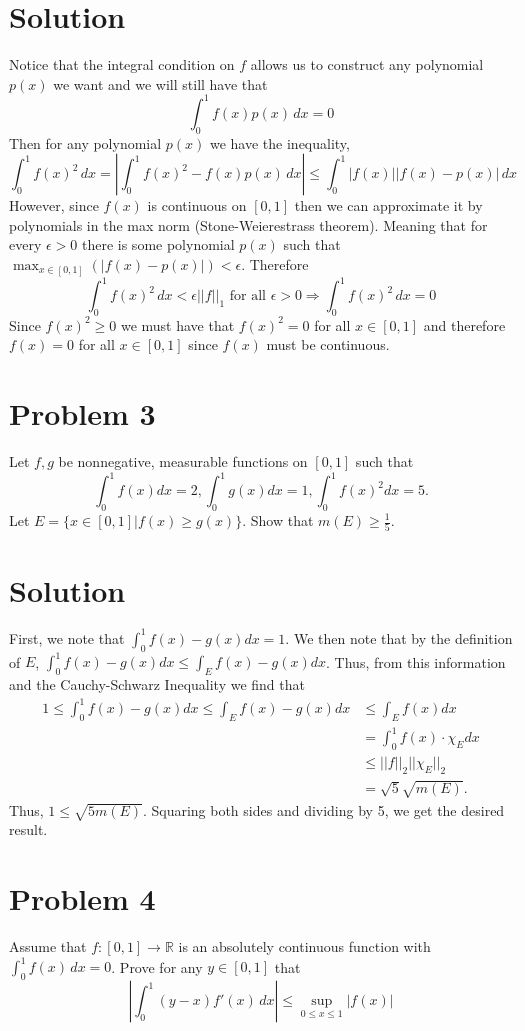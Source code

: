 \documentclass{article}
\newcommand{\field}[1]{\mathbb{#1}}
\begin{document}
\section*{Solution} 
Notice that the integral condition on $f$ allows us to construct any polynomial $p(x)$ we want and we will still have that
$$\int_0^1 f(x)p(x)\,dx=0$$
Then for any polynomial $p(x)$ we have the inequality,
$$\int_0^1f(x)^2\,dx=\left|\int_0^1f(x)^2-f(x)p(x)\,dx\right|\leq\int_0^1|f(x)||f(x)-p(x)|\,dx$$
However, since $f(x)$ is continuous on $[0,1]$ then we can approximate it by polynomials in the max norm (Stone-Weierestrass theorem). Meaning that for every $\epsilon>0$ there is some polynomial $p(x)$ such that $\max_{x\in[0,1]}(|f(x)-p(x)|)<\epsilon$. Therefore
$$\int_0^1f(x)^2\,dx<\epsilon||f||_1\text{ for all }\epsilon>0\Rightarrow\int_0^1f(x)^2\,dx=0$$
Since $f(x)^2\geq0$ we must have that $f(x)^2=0$ for all $x\in[0,1]$ and therefore $f(x)=0$ for all $x\in[0,1]$ since $f(x)$ must be continuous.

\section*{Problem 3}
Let $f,g$ be nonnegative, measurable functions on $[0,1]$ such that $$\int_0^1f(x)dx=2,\int_0^1g(x)dx=1,\int_0^1f(x)^2dx=5.$$  Let $E=\{x\in[0,1]|f(x)\geq g(x)\}.$ Show that $m(E)\geq\frac{1}{5}$.

\section*{Solution}
First, we note that $\int_0^1f(x)-g(x)dx=1$.  We then note that by the definition of $E$, $\int_0^1f(x)-g(x)dx\leq\int_Ef(x)-g(x)dx$.  Thus, from this information and the Cauchy-Schwarz Inequality we find that
\begin{align*}
1\leq\int_0^1f(x)-g(x)dx\leq\int_Ef(x)-g(x)dx&\leq\int_Ef(x)dx\\
&=\int_0^1f(x)\cdot\chi_Edx\\
&\leq||f||_2||\chi_E||_2\\
&=\sqrt{5}\sqrt{m(E)}.
\end{align*}
Thus, $1\leq\sqrt{5m(E)}$.  Squaring both sides and dividing by 5, we get the desired result.
\section*{Problem 4}
Assume that $f:[0,1]\to\field{R}$ is an absolutely continuous function with $\int_0^1 f(x)\,dx=0$. Prove for any $y\in[0,1]$ that
$$\left|\int_0^1(y-x)f'(x)\,dx\right|\leq\sup_{0\leq x\leq1}|f(x)|$$
\end{document}
